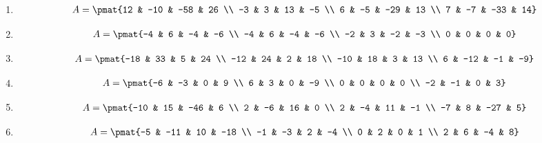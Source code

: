 \begin{enumerate}
\item

\begin{align*}
A = \pmat{12 & -10 & -58 & 26 \\ -3 & 3 & 13 & -5 \\ 6 & -5 & -29 & 13 \\ 7 & -7 & -33 & 14}
\end{align*}

\item

\begin{align*}
A = \pmat{-4 & 6 & -4 & -6 \\ -4 & 6 & -4 & -6 \\ -2 & 3 & -2 & -3 \\ 0 & 0 & 0 & 0}
\end{align*}

\item

\begin{align*}
A = \pmat{-18 & 33 & 5 & 24 \\ -12 & 24 & 2 & 18 \\ -10 & 18 & 3 & 13 \\ 6 & -12 & -1 & -9}
\end{align*}

\item

\begin{align*}
A = \pmat{-6 & -3 & 0 & 9 \\ 6 & 3 & 0 & -9 \\ 0 & 0 & 0 & 0 \\ -2 & -1 & 0 & 3}
\end{align*}

\item

\begin{align*}
A = \pmat{-10 & 15 & -46 & 6 \\ 2 & -6 & 16 & 0 \\ 2 & -4 & 11 & -1 \\ -7 & 8 & -27 & 5}
\end{align*}

\item

\begin{align*}
A = \pmat{-5 & -11 & 10 & -18 \\ -1 & -3 & 2 & -4 \\ 0 & 2 & 0 & 1 \\ 2 & 6 & -4 & 8}
\end{align*}


\end{enumerate}
